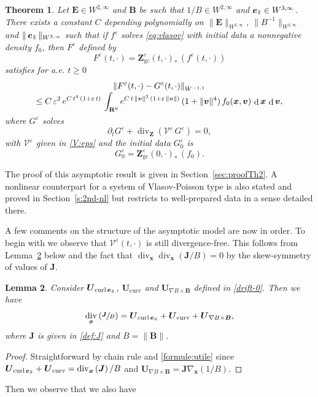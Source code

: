 \documentclass[10pt]{amsart}
\let\mathcal\mathscr
\let\eps\varepsilon
\let\d\partial
\DeclareMathOperator\dD{d}\let\dd\dD
\DeclareMathOperator{\Div}{div}
\DeclareMathOperator{\Curl}{curl}
\theoremstyle{plain}
\newtheorem{theorem}{Theorem}[section]
\newtheorem{lemma}[theorem]{Lemma}
\theoremstyle{definition}
\newcommand{\be}{\begin{equation}}
\newcommand{\ee}{\end{equation}}
\newcommand{\bt}{\begin{theorem}}
\newcommand{\et}{\end{theorem}}
\newcommand{\bl}{\begin{lemma}}
\newcommand{\el}{\end{lemma}}
\newcommand\R{\mathbf R}
\newcommand\bB{{\boldsymbol B}}
\newcommand\bE{{\boldsymbol E}}
\newcommand\bJ{{\boldsymbol J}}
\newcommand\bU{{\boldsymbol U}}
\newcommand\bZ{{\boldsymbol Z}}
\newcommand\bfv{{\boldsymbol v}}
\newcommand\bfx{{\boldsymbol x}}
\newcommand\bfZ{{\boldsymbol Z}}
\newcommand\cV{{\mathcal V}}
\DeclareMathOperator{\beD}{\boldsymbol{e}}
\newcommand\eDpar{\beD_\mypar}
\newcommand{\gradB}{\bU_{\nabla B\times\bB}}
\newcommand{\curvB}{\bU_{\mathrm{curv}}}
\newcommand{\rotB}{\bU_{\Curl\eDpar}}
\newcommand{\mypar}{{\mkern3mu\vphantom{\perp}\vrule depth 0pt\mkern2mu\vrule depth 0pt\mkern3mu}}
\begin{document}
\bt
\label{th:2}
Let $\bE\in W^{2,\infty}$ and $\bB$ be such that $1/B\in W^{2,\infty}$ and $\eDpar\in W^{3,\infty}$. There exists a constant $C$ depending polynomially on $\|\bE\|_{W^{2,\infty}}$, $\|B^{-1}\|_{W^{2,\infty}}$ and $\|\eDpar\|_{W^{3,\infty}}$ such that if $f^\eps$ solves \eqref{eq:vlasov} with initial data a nonnegative density $f_0$, then $F^\eps$ defined by\vspace*{-3pt}
\[
F^\eps(t,\cdot)= \bfZ_\mathrm{gc}^\eps(t,\cdot)_* \,(f^\eps(t,\cdot))
\]
satisfies for a.e. $t\geq0$\vspace*{-3pt}
\begin{multline*}
\|F^\eps(t,\cdot)-G^\eps(t,\cdot)\|_{\dot{W}^{-1,1}}\\[-3pt]
\leq C\,\eps^2\,e^{C\,t^4\,(1+\eps\,t)}\,\int_{\R^6} e^{C\,t\,\|\bfv\|^3\,(1+\eps\,\|\bfv\|)}\,(1+\|\bfv\|^4)\,f_0(\bfx,\bfv)\,\dD\bfx\,\dD\bfv,\vspace*{-3pt}
\end{multline*}
where $G^\eps$ solves\vspace*{-3pt}
\be
\label{eq:2nd}
\d_t G^\eps+\Div_{\bfZ} \left(\cV^\eps\,G^\eps\right)
=0,
\ee
with $\cV^\eps$ given in \eqref{V:eps} and the initial data $G_{0}^\eps$ is\vspace*{-3pt}
\[
G_{0}^\eps= \bZ_\mathrm{gc}^\eps(0,\cdot)_* \,(f_0).
\]
\et

The proof of this asymptotic result is given in Section~\ref{sec:proofTh2}. A nonlinear counterpart for a system of Vlasov-Poisson type is also stated and proved in Section~\ref{s:2nd-nl} but restricts to well-prepared data in a sense detailed there.

A few comments on the structure of the asymptotic model are now in order. To begin with we observe that $\cV^\eps(t,\cdot)$ is still divergence-free. This follows from Lemma~\ref{lem:00} below and the fact that $\Div_\bfx\Div_\bfx(\bJ/B)=0$ by the skew-symmetry of values of
$\bJ$.

\bl
\label{lem:00}
Consider $\rotB$, $\curvB$ and $\gradB$ defined in \eqref{drift-0}. Then we have
\[
\Div_\bfx\left( \sfrac{\bJ}{B}\right) = \rotB+\curvB+\gradB,
\]
where $\bJ$ is given in \eqref{def:J} and $B=\|\bB\|$.
\el
\begin{proof}
Straightforward by chain rule and \eqref{formule:utile} since $\rotB+\curvB=\Div_\bfx\left(\bJ\right)/B$ and $\gradB=\bJ\nabla_{\bfx}(1/B)$.
\end{proof}

Then we observe that we also have
\end{document}
